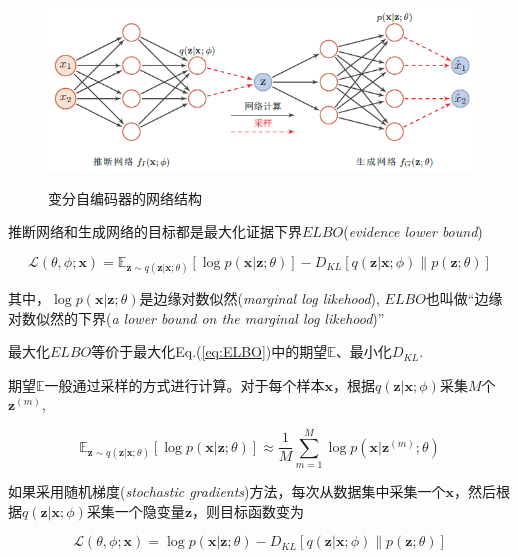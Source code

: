 \documentclass{article}
\begin{document}
	
\begin{figure}[htbp]
	\centering\includegraphics[height=5cm]{arch.png}
	\caption{变分自编码器的网络结构}
	\label{fig:arch}
\end{figure}

推断网络和生成网络的目标都是最大化证据下界$ELBO$(\emph{evidence lower bound})

\begin{equation}
\mathcal{L}(\theta,\phi;\mathbf{x})=\mathbb{E}_{\mathbf{z}\sim q(\mathbf{z}|\mathbf{x};\theta)}[\log p(\mathbf{x}|\mathbf{z};\theta)]-D_{KL}[q(\mathbf{z}|\mathbf{x};\phi)\lVert p(\mathbf{z};\theta)] \label{eq:ELBO}
\end{equation}

其中，$\log p(\mathbf{x}|\mathbf{z};\theta)$是边缘对数似然(\emph{marginal log likehood}), $ELBO$也叫做“边缘对数似然的下界(\emph{a lower bound on the marginal log likehood})” \par
最大化$ELBO$等价于最大化Eq.(\ref{eq:ELBO})中的期望$\mathbb{E}$、最小化$D_{KL}$. \par
期望$\mathbb{E}$一般通过采样的方式进行计算。对于每个样本$\mathbf{x}$，根据$q(\mathbf{z}|\mathbf{x};\phi)$采集$M$个$\mathbf{z}^{(m)}$,

\begin{equation}
\mathbb{E}_{\mathbf{z}\sim q(\mathbf{z}|\mathbf{x};\theta)}[\log p(\mathbf{x}|\mathbf{z};\theta)]\approx \frac{1}{M}\sum_{m=1}^{M}\log p(\mathbf{x}|\mathbf{z}^{(m)};\theta) \label{eq:E}
\end{equation}

\par
如果采用随机梯度(\emph{stochastic gradients})方法，每次从数据集中采集一个$\mathbf{x}$，然后根据$q(\mathbf{z}|\mathbf{x};\phi)$采集一个隐变量$\mathbf{z}$，则目标函数变为

\begin{equation}
\mathcal{L}(\theta,\phi;\mathbf{x})=\log p(\mathbf{x}|\mathbf{z};\theta)-D_{KL}[q(\mathbf{z}|\mathbf{x};\phi)\lVert p(\mathbf{z};\theta)] \label{eq:ELBO2}
\end{equation}
\end{document}
